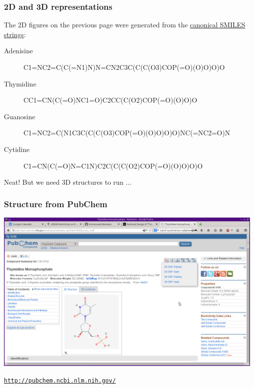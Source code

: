 \documentclass[10pt, xcolor=x11names, compress]{beamer}
\begin{document}
\begin{frame}
  \frametitle{2D and 3D representations}
  The 2D figures on the previous page were generated from the 
  \href{http://en.wikipedia.org/wiki/Simplified_molecular-input_line-entry_system}%
  {\color{Blue4}canonical SMILES strings}:

  \bigskip

  \begin{description}
  \item[Adenisine] {\tiny C1=NC2=C(C(=N1)N)N=CN2C3C(C(C(O3)COP(=O)(O)O)O)O}
  \item[Thymidine] {\tiny CC1=CN(C(=O)NC1=O)C2CC(C(O2)COP(=O)(O)O)O}
  \item[Guanosine] {\tiny C1=NC2=C(N1C3C(C(C(O3)COP(=O)(O)O)O)O)NC(=NC2=O)N}
  \item[Cytidine] {\tiny C1=CN(C(=O)N=C1N)C2C(C(C(O2)COP(=O)(O)O)O)O}
  \end{description}

  \bigskip

  \begin{alertblock}{}
    \centering Neat!  But we need 3D structures to run {\feff}...
  \end{alertblock}
\end{frame}

\begin{frame}
  \frametitle{Structure from PubChem}
  \includegraphics[width=\linewidth]{images/Thymidine-PubChem.png}  

  \medskip

  \begin{flushright}
    \href{http://pubchem.ncbi.nlm.nih.gov/}%
    {\color{Blue4}\texttt{http://pubchem.ncbi.nlm.nih.gov/}}
  \end{flushright}
\end{frame}
\end{document}
